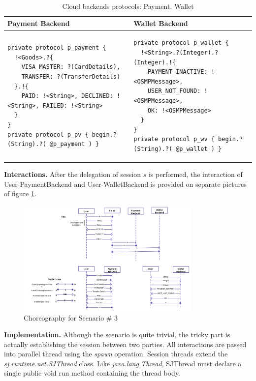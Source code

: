 {
\lstset{
framerule=0pt,
numbers=none
}
\begin{longtable}{|p{}|p{}|}
\caption{Cloud backends protocols: Payment, Wallet}\label{tab:cloud-payment} \\ \hline
\textbf{Payment Backend} & \textbf{Wallet Backend} \\ \hline \endhead
\begin{lstlisting}
private protocol p_payment { 
  !<Goods>.?{
    VISA_MASTER: ?(CardDetails),
    TRANSFER: ?(TransferDetails) 
  }.!{
    PAID: !<String>, DECLINED: !<String>, FAILED: !<String>
  } 
}
private protocol p_pv { begin.?(String).?( @p_payment ) }
\end{lstlisting}
&
\begin{lstlisting}
private protocol p_wallet { 
  !<String>.?(Integer).?(Integer).!{
    PAYMENT_INACTIVE: !<OSMPMessage>,
    USER_NOT_FOUND: !<OSMPMessage>,
    OK: !<OSMPMessage> 
  }
}
private protocol p_wv { begin.?(String).?( @p_wallet ) }
\end{lstlisting}
\\ \hline
\end{longtable}
}

\textbf{Interactions.} After the delegation of session $s$ is performed, the interaction of User-PaymentBackend and User-WalletBackend is provided on separate pictures of figure \ref{fig:interaction-sc3}.

\begin{figure}
\centering
\includegraphics[width=0.8\textwidth]{resources/interaction-sc3.png}
\caption{Choreography for Scenario \# 3}
\label{fig:interaction-sc3}
\end{figure}

\textbf{Implementation. } Although the scenario is quite trivial, the tricky part is actually establishing the session between two parties. All interactions are passed into parallel thread using the \textit{spawn} operation. Session threads extend the \textit{sj.runtime.net.SJThread} class. Like \textit{java.lang.Thread}, SJThread must declare a single public void run method containing the thread body.

